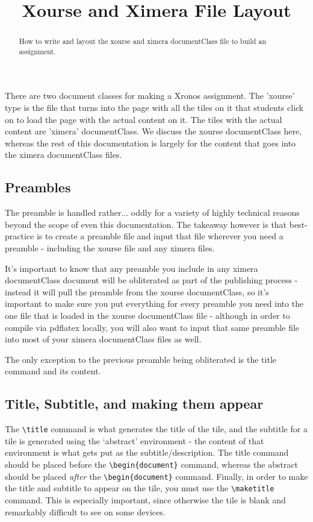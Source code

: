 \documentclass{ximera}
\title{Xourse and Ximera File Layout}
\begin{document}
\begin{abstract}
    How to write and layout the xourse and ximera documentClass file to build an assignment.
\end{abstract}
\maketitle

There are two document classes for making a Xronos assignment. The 'xourse' type is the file that turns into the page with all the tiles on it that students click on to load the page with the actual content on it. The tiles with the actual content are 'ximera' documentClass. We discuss the xourse documentClass here, whereas the rest of this documentation is largely for the content that goes into the ximera documentClass files.

\subsection*{Preambles}
    The preamble is handled rather... oddly for a variety of highly technical reasons beyond the scope of even this documentation. The takeaway however is that best-practice is to create a preamble file and input that file wherever you need a preamble - including the xourse file and any ximera files. 
    
    It's important to know that any preamble you include in any ximera documentClass document will be obliterated as part of the publishing process - instead it will pull the preamble from the xourse documentClass, so it's important to make sure you put everything for every preamble you need into the one file that is loaded in the xourse documentClass file - although in order to compile via pdflatex locally, you will also want to input that same preamble file into most of your ximera documentClass files as well.
    
    The only exception to the previous preamble being obliterated is the title command and its content.

\subsection*{Title, Subtitle, and making them appear}
    The \verb|\title| command is what generates the title of the tile, and the subtitle for a tile is generated using the `abstract' environment - the content of that environment is what gets put as the subtitle/description. The title command should be placed before the \verb|\begin{document}| command, whereas the abstract should be placed \textit{after} the \verb|\begin{document}| command. Finally, in order to make the title and subtitle to appear on the tile, you must use the \verb|\maketitle| command. This is especially important, since otherwise the tile is blank and remarkably difficult to see on some devices.
    
\end{document}
